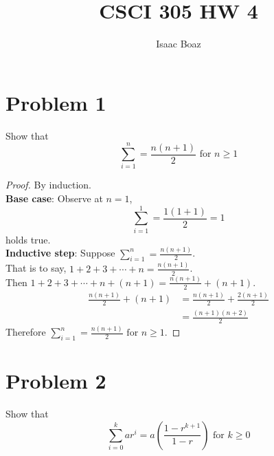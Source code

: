 \documentclass{article}
\title{CSCI 305 HW 4}
\author{Isaac Boaz}
\begin{document}
\maketitle

\section*{Problem 1}
Show that \[\sum_{i=1}^{n} = \frac{n(n+1)}{2} \text{ for } n \geq 1\]

\begin{proof}
    By induction. \\
    \textbf{Base case}: Observe at \(n = 1\),
    \begin{equation*}
        \sum_{i=1}^{1} = \frac{1(1+1)}{2} = 1
    \end{equation*} holds true. \\
    \textbf{Inductive step}: Suppose \(\sum_{i=1}^{n} = \frac{n(n+1)}{2}\). \\
    That is to say, \(1 + 2 + 3 + \cdots + n = \frac{n(n+1)}{2}\). \\
    Then \(1 + 2 + 3 + \cdots + n + (n + 1) = \frac{n(n+1)}{2} + (n+1)\). \\
    \begin{align*}
        \frac{n(n+1)}{2} + (n+1) & = \frac{n(n+1)}{2} + \frac{2(n+1)}{2} \\
                                 & = \frac{(n+1)(n+2)}{2}
    \end{align*}
    Therefore \(\sum_{i=1}^{n} = \frac{n(n+1)}{2} \text{ for } n \geq 1\).
\end{proof}

\pagebreak

\section*{Problem 2}
Show that \[\sum_{i=0}^{k}{ar^i} = a \left( \frac{1-r^{k+1}}{1-r} \right) \text{ for } k \geq 0\]
\end{document}
